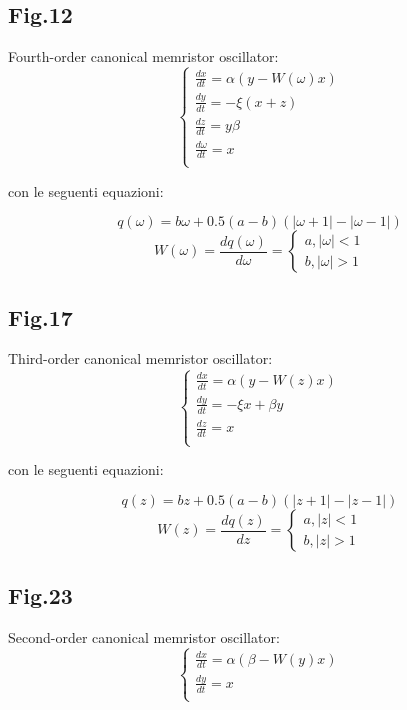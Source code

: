 \documentclass[12pt, a4paper]{book}
\begin{document}
\subsection{Fig.12}
Fourth-order canonical memristor oscillator:
\begin{equation}
\begin{cases}
\frac{dx}{dt}=\alpha(y-W(\omega)x)
\\
\frac{dy}{dt}=-\xi(x+z)
\\
\frac{dz}{dt}=y\beta
\\
\frac{d\omega}{dt}=x
\\
\end{cases}
\end{equation}

con le seguenti equazioni:

\begin{equation}
q(\omega)=b\omega+0.5(a-b)(|\omega+1|-|\omega-1|)
\end{equation}
\begin{equation}
W(\omega)=\frac{dq(\omega)}{d\omega}=
\begin{cases}
a, |\omega|<1
\\
b, |\omega|>1
\end{cases}
\end{equation}

\subsection{Fig.17}
Third-order canonical memristor oscillator:
\begin{equation}
\begin{cases}
\frac{dx}{dt}=\alpha(y-W(z)x)
\\
\frac{dy}{dt}=-\xi x+\beta y
\\
\frac{dz}{dt}=x
\\
\end{cases}
\end{equation}

con le seguenti equazioni:

\begin{equation}
q(z)=bz+0.5(a-b)(|z+1|-|z-1|)
\end{equation}
\begin{equation}
W(z)=\frac{dq(z)}{dz}=
\begin{cases}
a, |z|<1
\\
b, |z|>1
\end{cases}
\end{equation}

\subsection{Fig.23}
Second-order canonical memristor oscillator:
\begin{equation}
\begin{cases}
\frac{dx}{dt}=\alpha(\beta-W(y)x)
\\
\frac{dy}{dt}=x
\\
\end{cases}
\end{equation}
\end{document}
